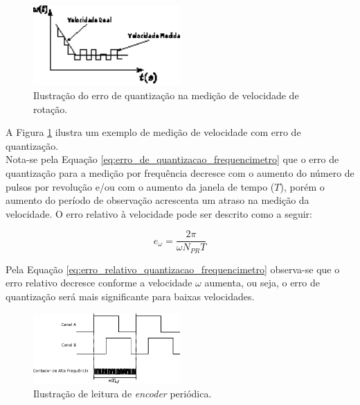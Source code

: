 \begin{figure}[H]
    \centering
    \includegraphics[width=0.5\textwidth]{figuras/ilustracoes/ilustracao_erro_de_quantizacao.eps}
    \caption{Ilustração do erro de quantização na medição de velocidade de rotação.}
    \label{fig:ilustracao_erro_quantizacao}
\end{figure}

A Figura \ref{fig:ilustracao_erro_quantizacao} ilustra um exemplo de medição de velocidade com erro de quantização.\\

Nota-se pela Equação \ref{eq:erro_de_quantizacao_frequencimetro} que o erro de quantização para a medição por frequência decresce com o aumento do número de pulsos por revolução e/ou com o aumento da janela de tempo ($T$), porém o aumento do período de observação acrescenta um atraso na medição da velocidade. O erro relativo à velocidade pode ser descrito como a seguir:

\begin{equation}
    e_{\omega} = \frac{2\pi}{\omega N_{PR} T}
    \label{eq:erro_relativo_quantizacao_frequencimetro}
\end{equation}

Pela Equação \ref{eq:erro_relativo_quantizacao_frequencimetro} observa-se que o erro relativo decresce conforme a velocidade $\omega$ aumenta, ou seja, o erro de quantização será mais significante para baixas velocidades.\\

\begin{figure}[H]
    \centering
    \includegraphics[width=0.5\textwidth]{figuras/ilustracoes/ilustracao_medicao_encoder_por_periodo.eps}
    \caption{Ilustração de leitura de \emph{encoder} periódica.}
    \label{fig:ilustracao_periodimetro}
\end{figure}

